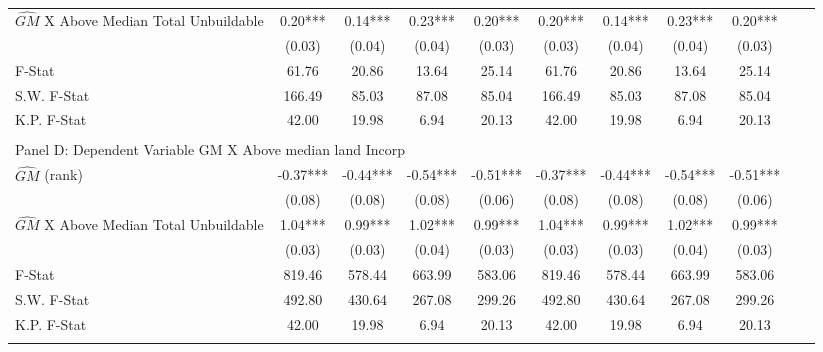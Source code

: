 \begin{table}[htbp]
\begin{threeparttable}
\begin{tabular}{l*{10}{c}}
\addlinespace
$\hat{GM}$ X Above Median Total Unbuildable&       0.20***&       0.14***&       0.23***&       0.20***&       0.20***&       0.14***&       0.23***&       0.20***\\
                &     (0.03)   &     (0.04)   &     (0.04)   &     (0.03)   &     (0.03)   &     (0.04)   &     (0.04)   &     (0.03)   \\
\midrule
F-Stat          &      61.76   &      20.86   &      13.64   &      25.14   &      61.76   &      20.86   &      13.64   &      25.14   \\
S.W. F-Stat     &     166.49   &      85.03   &      87.08   &      85.04   &     166.49   &      85.03   &      87.08   &      85.04   \\
K.P. F-Stat     &      42.00   &      19.98   &       6.94   &      20.13   &      42.00   &      19.98   &       6.94   &      20.13   \\
\cmidrule[\heavyrulewidth](lr){1-9} \\ \cmidrule[\heavyrulewidth](lr){1-9}
\multicolumn{8}{l}{Panel D: Dependent Variable GM X Above median land Incorp}\\
\cmidrule(lr){1-9}
$\hat{GM}$ (rank)&      -0.37***&      -0.44***&      -0.54***&      -0.51***&      -0.37***&      -0.44***&      -0.54***&      -0.51***\\
                &     (0.08)   &     (0.08)   &     (0.08)   &     (0.06)   &     (0.08)   &     (0.08)   &     (0.08)   &     (0.06)   \\
\addlinespace
$\hat{GM}$ X Above Median Total Unbuildable&       1.04***&       0.99***&       1.02***&       0.99***&       1.04***&       0.99***&       1.02***&       0.99***\\
                &     (0.03)   &     (0.03)   &     (0.04)   &     (0.03)   &     (0.03)   &     (0.03)   &     (0.04)   &     (0.03)   \\
\midrule
F-Stat          &     819.46   &     578.44   &     663.99   &     583.06   &     819.46   &     578.44   &     663.99   &     583.06   \\
S.W. F-Stat     &     492.80   &     430.64   &     267.08   &     299.26   &     492.80   &     430.64   &     267.08   &     299.26   \\
K.P. F-Stat     &      42.00   &      19.98   &       6.94   &      20.13   &      42.00   &      19.98   &       6.94   &      20.13   \\
\cmidrule[\heavyrulewidth](lr){1-9} \\ \cmidrule[\heavyrulewidth](lr){1-9}

\end{tabular}
\end{threeparttable}
\end{table}
